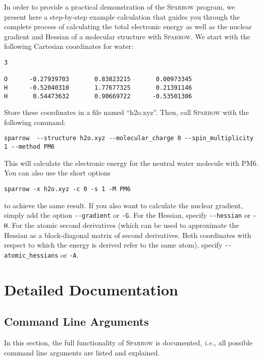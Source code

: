 \documentclass[]{tufte-book}
\begin{document}
In order to provide a practical demonstration of the \textsc{Sparrow} program, we present here a step-by-step example calculation that guides 
you through the complete process of calculating the total electronic energy as well as the nuclear gradient and Hessian of a molecular structure 
with \textsc{Sparrow}. We start with the following
Cartesian coordinates for water:
\begin{verbatim}
3

O      -0.27939703       0.83823215       0.00973345
H      -0.52040310       1.77677325       0.21391146
H       0.54473632       0.90669722      -0.53501306
\end{verbatim}
Store these coordinates in a file named ``h2o.xyz''. Then, call \textsc{Sparrow} with the following command:
\begin{verbatim}
sparrow  --structure h2o.xyz --molecular_charge 0 --spin_multiplicity 1 --method PM6
\end{verbatim}
This will calculate the electronic energy for the neutral water molecule with PM6. You can also use the short options
\begin{verbatim}
sparrow -x h2o.xyz -c 0 -s 1 -M PM6
\end{verbatim}
to achieve the same result. If you also want to calculate the nuclear gradient, simply add the option \texttt{-{}-gradient}
or \texttt{-G}. For the Hessian, specify \texttt{-{}-hessian} or \texttt{-H}. For the atomic second derivatives (which can be used to approximate the Hessian as a block-diagonal matrix of second derivatives. Both coordinates with respect to which the energy is derived refer to the same atom), specify \texttt{-{}-atomic\_hessians} or \texttt{-A}.



\chapter{Detailed Documentation}

\section{Command Line Arguments}

In this section, the full functionality of \textsc{Sparrow} is documented, \textit{i.e.}, all possible command line arguments
are listed and explained.
\end{document}
